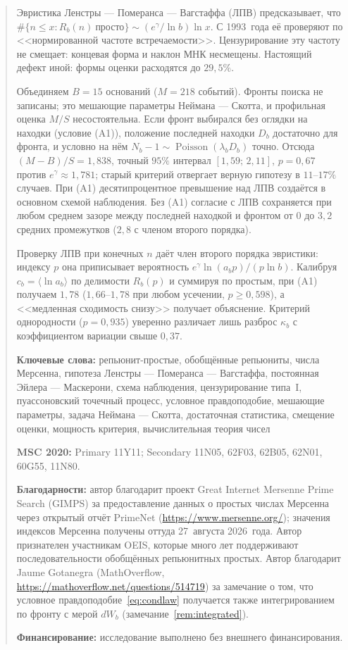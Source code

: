 \documentclass[11pt,a4paper]{article}
\theoremstyle{plain}
\theoremstyle{remark}
\newcommand{\Rb}{R_b}
\newcommand{\eg}{e^{\gamma}}
\DeclareMathOperator{\Pois}{Poisson}
\begin{document}
\begin{abstract}
Эвристика Ленстры --- Померанса --- Вагстаффа (ЛПВ) предсказывает, что
$\#\{n\le x:\Rb(n)\ \text{просто}\}\sim(\eg/\ln b)\ln x$. С 1993~года её проверяют
по <<нормированной частоте встречаемости>>. Цензурирование эту частоту не смещает:
концевая форма и наклон МНК несмещены. Настоящий дефект
иной: формы оценки расходятся до $29{,}5\%$.

Объединяем $B=15$ оснований ($M=218$ событий). Фронты поиска не записаны;
это мешающие параметры Неймана --- Скотта, и профильная оценка $M/S$
несостоятельна. Если фронт выбирался без оглядки на находки (условие (A1)),
положение последней находки $D_b$ достаточно для фронта, и условно на нём
$N_b-1\sim\Pois(\lambda_bD_b)$ точно. Отсюда $(M-B)/S=1{,}838$, точный $95\%$
интервал $[1{,}59;\,2{,}11]$, $p=0{,}67$ против $\eg\approx1{,}781$; старый
критерий отвергает верную гипотезу в $11$--$17\%$ случаев. При (A1)
десятипроцентное превышение над ЛПВ создаётся в основном схемой наблюдения.
Без (A1) согласие с ЛПВ сохраняется при любом среднем зазоре между последней находкой и фронтом от $0$ до
$3{,}2$ средних промежутков ($2{,}8$ с членом второго порядка).

Проверку ЛПВ при конечных $n$ даёт член второго порядка эвристики:
индексу $p$ она приписывает вероятность $\eg\ln(a_bp)/(p\ln b)$. Калибруя
$c_b=\langle\ln a_b\rangle$ по делимости $\Rb(p)$ и суммируя по
простым, при (A1) получаем $1{,}78$ ($1{,}66$--$1{,}78$ при любом усечении,
$p\ge0{,}598$), а
<<медленная сходимость снизу>> получает объяснение.
Критерий однородности ($p=0{,}935$) уверенно различает лишь разброс $\kappa_b$ с
коэффициентом вариации свыше $0{,}37$.

\medskip
\noindent\textbf{Ключевые слова:} репьюнит-простые, обобщённые репьюниты,
числа Мерсенна, гипотеза Ленстры --- Померанса --- Вагстаффа, постоянная
Эйлера --- Маскерони, схема наблюдения, цензурирование типа~I, пуассоновский
точечный процесс, условное правдоподобие, мешающие параметры, задача
Неймана --- Скотта, достаточная
статистика, смещение оценки, мощность критерия, вычислительная теория чисел

\medskip
\noindent\textbf{MSC 2020:} Primary 11Y11; Secondary 11N05, 62F03, 62B05,
62N01, 60G55, 11N80.

\medskip
\noindent\textbf{Благодарности:} автор благодарит проект Great Internet Mersenne
Prime Search (GIMPS) за предоставление данных о простых числах Мерсенна через
открытый отчёт PrimeNet (\url{https://www.mersenne.org/}); значения индексов
Мерсенна получены оттуда 27~августа 2026~года. Автор признателен участникам
OEIS, которые много лет поддерживают последовательности обобщённых репьюнитных
простых. Автор благодарит Jaume Gotanegra (MathOverflow,
\url{https://mathoverflow.net/questions/514719}) за замечание о том, что условное
правдоподобие~\eqref{eq:condlaw} получается также интегрированием по фронту с
мерой $dW_b$ (замечание~\ref{rem:integrated}).

\medskip
\noindent\textbf{Финансирование:} исследование выполнено без внешнего
финансирования.
\end{abstract}
\end{document}
